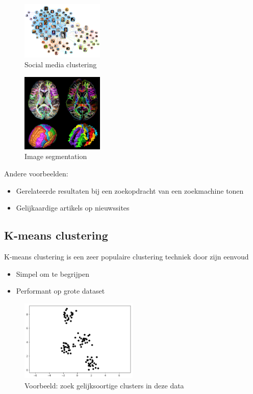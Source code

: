 \documentclass{article}
\begin{document}
\begin{figure}[H]
    \centering
    \includegraphics[width=0.35\textwidth]{clustering-socialmedia.png}
    \caption{Social media clustering}
\end{figure}

\begin{figure}[H]
    \centering
    \includegraphics[width=0.35\textwidth]{clustering-image-segmentation.png}
    \caption{Image segmentation}
\end{figure}


Andere voorbeelden:

\begin{itemize}
    \item Gerelateerde resultaten bij een zoekopdracht van een zoekmachine tonen
    \item Gelijkaardige artikels op nieuwssites
\end{itemize}

\subsection{K-means clustering}

K-means clustering is een zeer populaire clustering techniek door zijn eenvoud

\begin{itemize}
    \item Simpel om te begrijpen
    \item Performant op grote dataset
\end{itemize}

\begin{figure}[H]
    \centering
    \includegraphics[width=0.5\textwidth]{k-means-1.png}
    \caption{Voorbeeld: zoek gelijksoortige clusters in deze data}
\end{figure}
\end{document}
